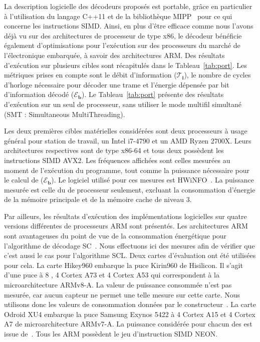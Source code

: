 \begin{table}[ht]
{{\begin{tabular}{r|c|c|c c c c| c c c| c c c}
    \end{tabular}
    }}
  \end{table}

La description logicielle des décodeurs proposés est portable, grâce en particulier à l'utilisation du langage C++11 et de la bibliothèque MIPP~\cite{cassagne2018mipp} pour ce qui concerne les instructions SIMD. Ainsi, en plus d'être efficace comme nous l'avons déjà vu sur des architectures de processeur de type x86, le décodeur bénéficie également d'optimisations pour l'exécution sur des processeurs du marché de l'électronique embarquée, à savoir des architectures ARM. Des résultats d'exécution sur plusieurs cibles sont récapitulés dans le Tableau~\ref{tab:port}. Les métriques prises en compte sont le débit d'information ($\bm{\mathcal{T}_i}$), le nombre de cycles d'horloge nécessaire pour décoder une trame et l'énergie dépensée par bit d'information décodé ($\bm{\mathcal{E}_b}$). Le Tableau~\ref{tab:port}  présente des résultats d'exécution sur un seul \coeur de processeur, sans utiliser le mode multifil simultané (SMT : Simultaneous MultiThreading).

Les deux premières cibles matérielles considérées sont deux processeurs à usage général pour station de travail, un Intel i7-4790 et un AMD Ryzen 2700X. Leurs architectures respectives sont de type x86-64 et tous deux possèdent les instructions SIMD AVX2. Les fréquences affichées sont celles mesurées au moment de l'exécution du programme, tout comme la puissance nécessaire pour le calcul de ($\bm{\mathcal{E}_b}$). Le logiciel utilisé pour ces mesures est HWiNFO~\cite{noauthor_hwinfo_nodate}. La puissance mesurée est celle du \coeur de processeur seulement, excluant la consommation d'énergie de la mémoire principale et de la mémoire cache de niveau 3.

Par ailleurs, les résultats d'exécution des implémentations logicielles sur quatre versions différentes de processeurs ARM sont présentés. Les architectures ARM sont avantageuses du point de vue de la consommation énergétique pour l'algorithme de décodage SC~\cite{cassagne_energy_2016}. Nous effectuons ici des mesures afin de vérifier que c'est aussi le cas pour l'algorithme SCL. Deux cartes d'évaluation ont été utilisées pour cela. La carte Hikey960 embarque la puce Kirin960 de Hisilicon. Il s'agit d'une puce à 8 \coeurs, 4 Cortex A73 et 4 Cortex A53 qui correspondent à la microarchitecture ARMv8-A. La valeur de puissance consommée n'est pas mesurée, car aucun capteur ne permet une telle mesure sur cette carte. Nous utilisons donc les valeurs de consommation données par le constructeur~\cite{humrick_hisilicon_nodate}. La carte Odroid XU4 embarque la puce Samsung Exynos 5422 à 4 \coeurs Cortex A15 et 4 \coeurs Cortex A7 de microarchitecture ARMv7-A. La puissance considérée pour chacun des \coeurs est issue de~\cite{holmgren_energy_nodate,benmoussa_performance_nodate}. Tous les \coeurs ARM possèdent le jeu d'instruction SIMD NEON.


